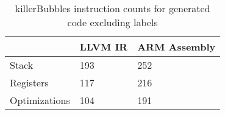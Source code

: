 \begin{table}[h!]
\centering
\begin{tabular}{p{}p{}p{}}
  \hline
 & LLVM IR & ARM Assembly \\ 
  \hline
Stack & 193 & 252 \\ 
  Registers & 117 & 216 \\ 
  Optimizations & 104 & 191 \\ 
   \hline
\end{tabular}
\caption{killerBubbles instruction counts for generated code excluding labels}
\end{table}
